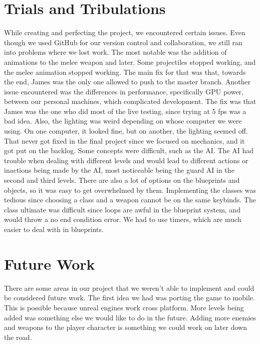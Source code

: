 \documentclass{sigchi}
\begin{document}
\section{Trials and Tribulations}
While creating and perfecting the project, we encountered certain issues. Even though we used GitHub for our version control and collaboration, we still ran into problems where we lost work. The most notable was the addition of animations to the melee weapon and later. Some projectiles stopped working, and the melee animation stopped working. The main fix for that was that, towards the end, James was the only one allowed to push to the master branch. Another issue encountered was the differences in performance, specifically GPU power, between our personal machines, which complicated development. The fix was that James was the one who did most of the live testing, since trying at 5 fps was a bad idea. Also, the lighting was weird depending on whose computer we were using. On one computer, it looked fine, but on another, the lighting seemed off. That never got fixed in the final project since we focused on mechanics, and it got put on the backlog. Some concepts were difficult, such as the AI. The AI had trouble when dealing with different levels and would lead to different actions or inactions being made by the AI, most noticeable being the guard AI in the second and third levels. There are also a lot of options on the blueprints and objects, so it was easy to get overwhelmed by them. Implementing the classes was tedious since choosing a class and a weapon cannot be on the same keybinds. The class ultimate was difficult since loops are awful in the blueprint system, and would throw a no end condition error. We had to use timers, which are much easier to deal with in blueprints.

\section{Future Work}
There are some areas in our project that we weren't able to implement and could be considered future work. The first idea we had was porting the game to mobile. This is possible because unreal engines work cross platform. More levels being added was something else we would like to do in the future. Adding more enemies and weapons to the player character is something we could work on later down the road. 
\end{document}
